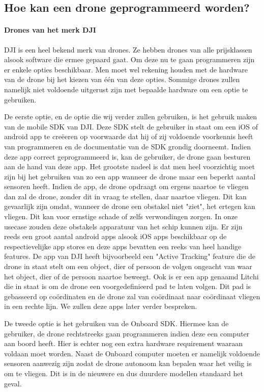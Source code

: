 \subsection{Hoe kan een drone geprogrammeerd worden?}

\paragraph{Drones van het merk DJI}

DJI is een heel bekend merk van drones. Ze hebben drones van alle prijsklassen alsook software die ermee gepaard gaat. Om deze nu te gaan programmeren zijn er enkele opties beschikbaar. Men moet wel rekening houden met de hardware van de drone bij het kiezen van één van deze opties. Sommige drones zullen namelijk niet voldoende uitgerust zijn met bepaalde hardware om een optie te gebruiken.

De eerste optie, en de optie die wij verder zullen gebruiken, is het gebruik maken van de mobile SDK van DJI. Deze SDK stelt de gebruiker in staat om een iOS of android app te creëeren op voorwaarde dat hij of zij voldoende voorkennis heeft van programmeren en de documentatie van de SDK grondig doorneemt. Indien deze app correct geprogrammeerd is, kan de gebruiker, de drone gaan besturen aan de hand van deze app. Het grootste nadeel is dat men heel voorzichtig moet zijn bij het gebruiken van zo een app wanneer de drone maar een beperkt aantal sensoren heeft. Indien de app, de drone opdraagt om ergens naartoe te vliegen dan zal de drone, zonder dit in vraag te stellen, daar naartoe vliegen. Dit kan gevaarlijk zijn omdat, wanneer de drone een obstakel niet "ziet", het ertegen kan vliegen. Dit kan voor ernstige schade of zelfs verwondingen zorgen. In onze usecase zouden deze obstakels apparatuur van het schip kunnen zijn. Er zijn reeds een groot aantal android apps alsook iOS apps beschikbaar op de respectievelijke app stores en deze apps bevatten een reeks van heel handige features. De app van DJI heeft bijvoorbeeld een "Active Tracking" feature die de drone in staat stelt om een object, dier of persoon de volgen ongeacht van waar het object, dier of de persoon naartoe beweegt. Ook is er een app genaamd Litchi die in staat is om de drone een voorgedefinieerd pad te laten volgen. Dit pad is gebasseerd op coördinaten en de drone zal van coördinaat naar coördinaat vliegen in een rechte lijn. We zullen deze apps later verder bespreken.

De tweede optie is het gebruiken van de Onboard SDK. Hiermee kan de gebruiker, de drone rechtstreeks gaan programmeren indien deze een computer aan boord heeft. Hier is echter nog een extra hardware requirement waaraan voldaan moet worden. Naast de Onboard computer moeten er namelijk voldoende sensoren aanwezig zijn zodat de drone autonoom kan bepalen waar het veilig is om te vliegen. Dit is in de nieuwere en dus duurdere modellen standaard het geval.


